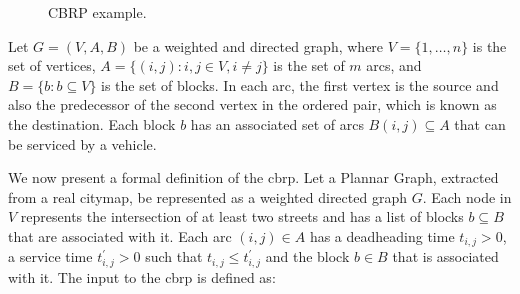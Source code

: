 \begin{figure}[!ht]
	\begin{minipage}[c]{.49\textwidth}
		\centering
		 \end{minipage}%
	\begin{minipage}[c]{.49\textwidth}
		\centering
	\end{minipage}
	\caption{\label{fig:route-ex} CBRP example.}
\end{figure}


Let $G = (V, A, B)$ be a weighted and directed graph, where $V = \{1, \dots, n\}$
is the set of vertices, $A = \{(i, j) : i, j \in V, i \neq j\}$
is the set of $m$ arcs, and $B = \{b : b \subseteq V\}$ is the set of blocks.
In each arc, the first vertex is the source and also the
predecessor of the second vertex in the ordered pair, which is known as the
destination. Each block $b$ has an associated set of arcs $B(i, j) \subseteq A$ that
can be serviced by a vehicle. 

We now present a formal definition of the \gls{cbrp}. Let a Plannar Graph,
extracted from a real citymap, be represented as a weighted directed graph
$G$. Each node in $V$ represents the intersection of at least two
streets and has a list of blocks $b \subseteq B$ that are associated with it.
Each arc $(i, j) \in A$ has a deadheading time $t_{i, j} > 0$, a service time
$t^{'}_{i, j} > 0$ such that $t_{i, j} \leqslant t^{'}_{i, j}$ and the block
$b \in B$ that is associated with it. The input to the \gls{cbrp} is defined as:

